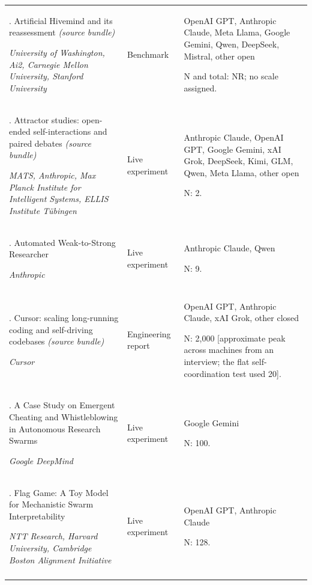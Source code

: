 \begin{longtable}{@{}>{\raggedright\arraybackslash}p{}>{\raggedright\arraybackslash}p{}>{\raggedright\arraybackslash}p{}@{}}
6. Artificial Hivemind and its reassessment \emph{(source bundle)} \citep{artificial-hivemind,artificial-hivemind-reevaluation}\par\emph{University of Washington, Ai2, Carnegie Mellon University, Stanford University} & Benchmark & OpenAI GPT, Anthropic Claude, Meta Llama, Google Gemini, Qwen, DeepSeek, Mistral, other open\par N and total: NR; no scale assigned. \\ \addlinespace[2pt]
7. Attractor studies: open-ended self-interactions and paired debates \emph{(source bundle)} \citep{attractor-states-jakkli-post,attractor-states-anthropic-card,attractor-states-ko-geiping-paper}\par\emph{MATS, Anthropic, Max Planck Institute for Intelligent Systems, ELLIS Institute Tübingen} & Live experiment & Anthropic Claude, OpenAI GPT, Google Gemini, xAI Grok, DeepSeek, Kimi, GLM, Qwen, Meta Llama, other open\par N: 2. \\ \addlinespace[2pt]
8. Automated Weak-to-Strong Researcher \citep{automated-w2s-researcher}\par\emph{Anthropic} & Live experiment & Anthropic Claude, Qwen\par N: 9. \\ \addlinespace[2pt]
9. Cursor: scaling long-running coding and self-driving codebases \emph{(source bundle)} \citep{cursor-scaling-long-running,cursor-self-driving}\par\emph{Cursor} & Engineering report & OpenAI GPT, Anthropic Claude, xAI Grok, other closed\par N: 2,000 [approximate peak across machines from an interview; the flat self-coordination test used 20]. \\ \addlinespace[2pt]
10. A Case Study on Emergent Cheating and Whistleblowing in Autonomous Research Swarms \citep{deepmind-cheating-whistleblowing}\par\emph{Google DeepMind} & Live experiment & Google Gemini\par N: 100. \\ \addlinespace[2pt]
11. Flag Game: A Toy Model for Mechanistic Swarm Interpretability \citep{flag-game}\par\emph{NTT Research, Harvard University, Cambridge Boston Alignment Initiative} & Live experiment & OpenAI GPT, Anthropic Claude\par N: 128. \\ \addlinespace[2pt]

\end{longtable}
